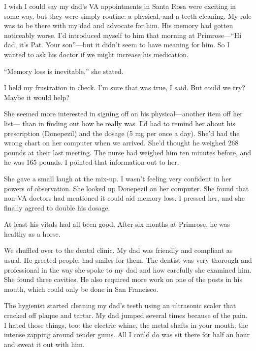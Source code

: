 \documentclass[12pt]{book}
\begin{document}
I wish I could say my dad's VA appointments in Santa Rosa were exciting in some way, but they were simply routine: a physical, and a teeth-cleaning. My role was to be there with my dad and advocate for him. His memory had gotten noticeably worse. I'd introduced myself to him that morning at Primrose---``Hi dad, it's Pat. Your son''---but it didn't seem to have meaning for him. So I wanted to ask his doctor if we might increase his medication.

``Memory loss is inevitable,'' she stated.

I held my frustration in check. I'm sure that was true, I said. But could we try? Maybe it would help?

She seemed more interested in signing off on his physical---another item off her list--- than in finding out how he really was. I'd had to remind her about his prescription (Donepezil) and the dosage (5 mg per once a day). She'd had the wrong chart on her computer when we arrived. She'd thought he weighed 268 pounds at their last meeting. The nurse had weighed him ten minutes before, and he was 165 pounds. I pointed that information out to her.

She gave a small laugh at the mix-up. I wasn't feeling very confident in her powers of observation. She looked up Donepezil on her computer. She found that non-VA doctors had mentioned it could aid memory loss. I pressed her, and she finally agreed to double his dosage.

At least his vitals had all been good. After six months at Primrose, he was healthy as a horse.

We shuffled over to the dental clinic. My dad was friendly and compliant as usual. He greeted people, had smiles for them. The dentist was very thorough and professional in the way she spoke to my dad and how carefully she examined him. She found three cavities. He also required more work on one of the posts in his mouth, which could only be done in San Francisco.

The hygienist started cleaning my dad's teeth using an ultrasonic scaler that cracked off plaque and tartar. My dad jumped several times because of the pain. I hated those things, too: the electric whine, the metal shafts in your mouth, the intense zapping around tender gums. All I could do was sit there for half an hour and sweat it out with him.
\end{document}
